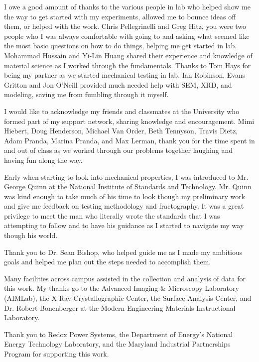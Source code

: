 I owe a good amount of thanks to the various people in lab who helped show me the way to get started with my experiments, allowed me to bounce ideas off them, or helped with the work.
Chris Pellegrinelli and Greg Hitz, you were two people who I was always comfortable with going to and asking what seemed like the most basic questions on how to do things, helping me get started in lab.
Mohammad Hussain and Yi-Lin Huang shared their experience and knowledge of material science as I worked through the fundamentals.
Thanks to Tom Hays for being my partner as we started mechanical testing in lab.
Ian Robinson, Evans Gritton and Jon O'Neill provided much needed help with SEM, XRD, and modeling, saving me from fumbling through it myself.

I would like to acknowledge my friends and classmates at the University who formed part of my support network, sharing knowledge and encouragement.
Mimi Hiebert, Doug Henderson, Michael Van Order, Beth Tennyson, Travis Dietz, Adam Pranda, Marina Pranda, and Max Lerman, thank you for the time spent in and out of class as we worked through our problems together laughing and having fun along the way.

Early when starting to look into mechanical properties, I was introduced to Mr. George Quinn at the National Institute of Standards and Technology.
Mr. Quinn was kind enough to take much of his time to look though my preliminary work and give me feedback on testing methodology and fractography.
It was a great privilege to meet the man who literally wrote the standards that I was attempting to follow and to have his guidance as I started to navigate my way though his world.

Thank you to Dr. Sean Bishop, who helped guide me as I made my ambitious goals and helped me plan out the steps needed to accomplish them.

Many facilities across campus assisted in the collection and analysis of data for this work. My thanks go to the Advanced Imaging \& Microscopy Laboratory (AIMLab), the X-Ray Crystallographic Center, the Surface Analysis Center, and Dr. Robert Bonenberger at the Modern Engineering Materials Instructional Laboratory.

Thank you to Redox Power Systems, the Department of Energy's National Energy Technology Laboratory, and the Maryland Industrial Partnerships Program for supporting this work.

